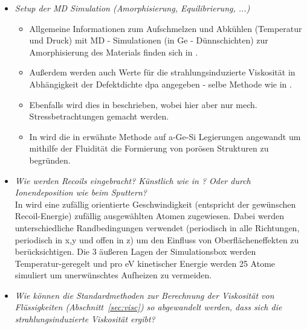 \documentclass[a4paper, 10pt, 
               numbers=noenddot, toc=graduated,
               headsepline=true, footsepline=true,
               twoside=false, titlepage=true, 
               bibliography=totoc]{scrartcl}
\newcommand{\refsec}[1]  {Abschnitt~\ref{#1}}
\begin{document}
\begin{itemize}

   \item \textit{Setup der MD Simulation (Amorphisierung, Equilibrierung, ...)}
   
	\begin{itemize}
	   \item Allgemeine Informationen zum Aufschmelzen und Abkühlen (Temperatur und Druck) mit MD - Simulationen (in Ge - Dünnschichten) zur Amorphisierung des Materials finden sich in \cite{Mayr2005}. 
	   
	   \item Außerdem werden auch Werte für die strahlungsinduzierte Viskosität in Abhängigkeit der Defektdichte dpa angegeben - selbe Methode wie in \cite{Mayr2003}. 

	   \item Ebenfalls wird dies in \cite{Edler2007} beschrieben, wobei hier aber nur mech. Stressbetrachtungen gemacht werden. 
	   
	   \item In \cite{Lehnert2017} wird die in \cite{Mayr2003} erwähnte Methode auf a-Ge-Si Legierungen angewandt um mithilfe der Fluidität die Formierung von porösen Strukturen zu begründen.
	   
	\end{itemize}	   
   
   \item \textit{Wie werden Recoils eingebracht? Künstlich wie in \cite{Mayr2003}? Oder durch Ionendeposition wie beim Sputtern?}\\
In \cite{Mayr2005} wird eine zufällig orientierte Geschwindigkeit (entspricht der gewünschen Recoil-Energie) zufällig ausgewählten Atomen zugewiesen. Dabei werden unterschiedliche Randbedingungen verwendet (periodisch in alle Richtungen, periodisch in x,y und offen in z) um den Einfluss von Oberflächeneffekten zu berücksichtigen. Die 3 äußeren Lagen der Simulationsbox werden Temperatur-geregelt und pro eV kinetischer Energie werden 25 Atome simuliert um unerwünschtes Aufheizen zu vermeiden. 

   \item \textit{Wie können die Standardmethoden zur Berechnung der Viskosität von Flüssigkeiten (\refsec{sec:visc}) so abgewandelt werden, dass sich die strahlungsinduzierte Viskosität ergibt?}
   
 

\end{itemize}
\end{document}
